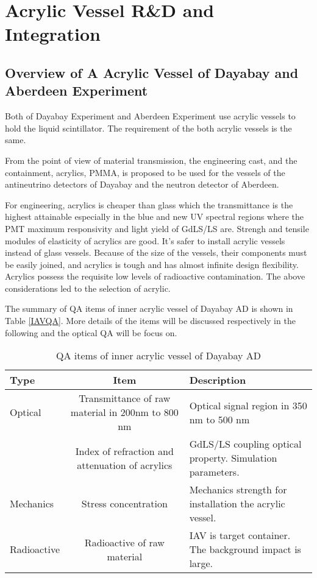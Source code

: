\chapter {Acrylic Vessel R\&D and Integration}
\label{chap:arylicVessel}
\section {Overview of A Acrylic Vessel of Dayabay and Aberdeen Experiment}

Both of Dayabay Experiment and Aberdeen Experiment use acrylic vessels to hold
the liquid scintillator. The requirement of the both acrylic vessels is the same.

From the point of view of material transmission, the engineering cast, and the containment, 
acrylics, PMMA, is proposed to be used for the vessels of the antineutrino detectors of Dayabay and the neutron detector of Aberdeen.

For engineering, acrylics is cheaper than glass which the transmittance is the highest attainable
especially in the blue and new UV spectral regions where the PMT maximum responsivity and light yield of GdLS/LS are.
Strengh and tensile modules of elasticity of acrylics are good.
It's safer to install acrylic vessels instead of glass vessels.
Because of the size of the vessels, their components must be easily joined, and acrylics
is tough and has almost infinite design flexibility.
Acrylics possess the requisite low levels of radioactive contamination.
The above considerations led to the selection of acrylic.

The summary of QA items of inner acrylic vessel of Dayabay AD is shown in
Table \ref{IAVQA}. More details of the items will be discussed respectively in the following and
the optical QA will be focus on.
\begin{table}
\centering
\caption{QA items of inner acrylic vessel of Dayabay AD}
\label{tab:IAVQA}
\begin{tabular}{lcp{5.0cm}}
\hline
Type & Item & Description \\
\hline
\hline
Optical & Transmittance of raw material in 200nm to 800 nm & Optical signal region in 350 nm to 500 nm \\
        & Index of refraction and attenuation of acrylics & GdLS/LS coupling optical property. Simulation parameters.\\
Mechanics & Stress concentration & Mechanics strength for installation the acrylic vessel. \\
Radioactive & Radioactive of raw material & IAV is target container. The background impact is large.\\
\hline
\end{tabular}
\end{table}





